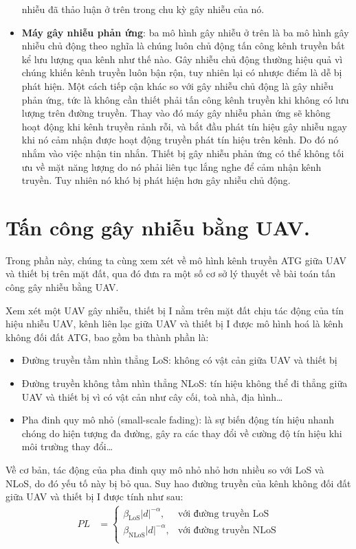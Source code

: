 \documentclass{uetgraduation}
\begin{document}
\begin{itemize}
    nhiễu đã thảo luận ở trên trong chu kỳ gây nhiễu của nó.
    \item \textbf{Máy gây nhiễu phản ứng}: ba mô hình gây nhiễu ở trên là ba mô hình gây nhiễu chủ động theo nghĩa là chúng luôn chủ động tấn công kênh truyền
    bất kể lưu lượng qua kênh như thế nào. Gây nhiễu chủ động thường hiệu quả vì chúng khiến kênh truyền luôn bận rộn, tuy nhiên lại có nhược điểm là dễ bị phát
    hiện. Một cách tiếp cận khác so với gây nhiễu chủ động là gây nhiễu phản ứng, tức là không cần thiết phải tấn công kênh truyền khi không có lưu lượng trên đường
    truyền. Thay vào đó máy gây nhiễu phản ứng sẽ không hoạt động khi kênh truyền rảnh rỗi, và bắt đầu phát tín hiệu gây nhiễu ngay khi nó cảm nhận được hoạt động
    truyền phát tín hiệu trên kênh. Do đó nó nhắm vào việc nhận tin nhắn. Thiết bị gây nhiễu phản ứng có thể không tối ưu về mặt năng lượng do nó phải liên tục lắng
    nghe để cảm nhận kênh truyền. Tuy nhiên nó khó bị phát hiện hơn gây nhiễu chủ động.
\end{itemize}

\section{Tấn công gây nhiễu bằng UAV.}
Trong phần này, chúng ta cùng xem xét về mô hình kênh truyền ATG giữa UAV và thiết bị trên mặt đất, qua đó đưa ra một số cơ sở lý thuyết về bài toán tấn công gây
nhiễu bằng UAV.

Xem xét một UAV gây nhiễu, thiết bị I nằm trên mặt đất chịu tác động của tín hiệu nhiễu UAV, kênh liên lạc giữa UAV và thiết bị I được mô 
hình hoá là kênh không đối đất ATG, bao gồm ba thành phần là:
\begin{itemize}
    \item Đường truyền tầm nhìn thẳng LoS: không có vật cản giữa UAV và thiết bị
    \item Đường truyền không tầm nhìn thẳng NLoS: tín hiệu không thể đi thẳng giữa UAV và thiết bị vì có vật cản như cây cối, toà nhà, địa hình\dots 
    \item Pha đinh quy mô nhỏ (small-scale fading): là sự biến động tín hiệu nhanh chóng do hiện tượng đa đường, gây ra các thay đổi về cường độ tín hiệu khi môi trường
    thay đổi\dots
\end{itemize}

Về cơ bản, tác động của pha đinh quy mô nhỏ nhỏ hơn nhiều so với LoS và NLoS, do đó yếu tố này bị bỏ qua. Suy hao đường truyền của kênh không đối đất giữa UAV và thiết
bị I được tính như sau:
\begin{align*}
    PL &= \begin{cases}
        \beta_\text{LoS}|d|^{-\alpha}, & \text{với đường truyền LoS} \\
        \beta_\text{NLoS}|d|^{-\alpha}, & \text{với đường truyền NLoS} \\
    \end{cases}
\end{align*}
\end{document}
